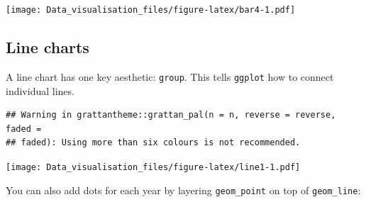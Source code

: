 \documentclass[]{book}
\newenvironment{Shaded}{\begin{snugshade}}{\end{snugshade}}
\newcommand{\DataTypeTok}[1]{\textcolor[rgb]{0.13,0.29,0.53}{#1}}
\newcommand{\DecValTok}[1]{\textcolor[rgb]{0.00,0.00,0.81}{#1}}
\newcommand{\KeywordTok}[1]{\textcolor[rgb]{0.13,0.29,0.53}{\textbf{#1}}}
\newcommand{\NormalTok}[1]{#1}
\newcommand{\OperatorTok}[1]{\textcolor[rgb]{0.81,0.36,0.00}{\textbf{#1}}}
\newcommand{\StringTok}[1]{\textcolor[rgb]{0.31,0.60,0.02}{#1}}
\begin{document}
\texttt{[image: Data\_visualisation\_files/figure-latex/bar4-1.pdf]}

\hypertarget{line-charts}{%
\subsection{Line charts}\label{line-charts}}

A line chart has one key aesthetic: \texttt{group}. This tells \texttt{ggplot} how to connect individual lines.

\begin{Shaded}
\end{Shaded}

\begin{verbatim}
## Warning in grattantheme::grattan_pal(n = n, reverse = reverse, faded =
## faded): Using more than six colours is not recommended.
\end{verbatim}

\texttt{[image: Data\_visualisation\_files/figure-latex/line1-1.pdf]}

You can also add dots for each year by layering \texttt{geom\_point} on top of \texttt{geom\_line}:
\end{document}

